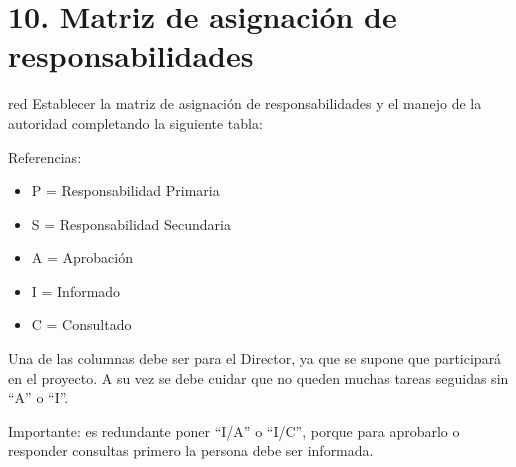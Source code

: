\documentclass[
11pt, %
codirector, %
]{charter}
\begin{document}
\section{10. Matriz de asignación de responsabilidades}
\label{sec:responsabilidades}
\begin{consigna}{red}
Establecer la matriz de asignación de responsabilidades y el manejo de la autoridad completando la siguiente tabla:

\begin{table}[htpb]
\centering
{}
\end{table}

{\footnotesize
Referencias:
\begin{itemize}
	\item P = Responsabilidad Primaria
	\item S = Responsabilidad Secundaria
	\item A = Aprobación
	\item I = Informado
	\item C = Consultado
\end{itemize}
} %

Una de las columnas debe ser para el Director, ya que se supone que participará en el proyecto.
A su vez se debe cuidar que no queden muchas tareas seguidas sin ``A'' o ``I''.

Importante: es redundante poner ``I/A'' o ``I/C'', porque para aprobarlo o responder consultas primero la persona debe ser informada.

\end{consigna}
\end{document}
